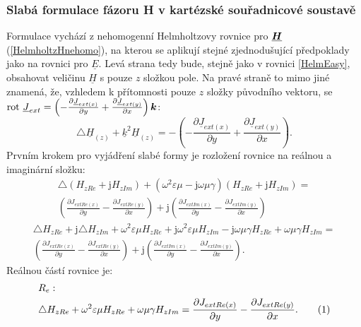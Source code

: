 \documentclass[12pt,a4paper,oneside]{article}
\numberwithin{equation}{section} %
\numberwithin{figure}{section} %
\numberwithin{table}{section} %
\newcommand{\mj}{\mathrm{j}} %
\renewcommand{\vec}[1]{\mbox{\boldmath$#1$}} %
\newcommand{\faz}[1]{{\underline{#1}}} %
\newcommand{\rot}{\mathrm{rot}\ }
\newcommand\numberthis{\addtocounter{equation}{1}\tag{\theequation}}
\begin{document}
\subsubsection{Slabá formulace fázoru H v kartézské souřadnicové soustavě}
Formulace vychází z nehomogenní Helmholtzovy rovnice pro $\faz{\vec{H}}$ (\ref{HelmholtzHnehomo}), na kterou se aplikují stejné zjednodušující předpoklady jako na rovnici pro $\faz{E}$. Levá strana tedy bude, stejně jako v rovnici \ref{HelmEasy}, obsahovat veličinu $\faz{H}$ s pouze $z$ složkou pole. Na pravé straně to mimo jiné znamená, že, vzhledem k přítomnosti pouze $z$ složky původního vektoru, se $\rot \faz{J} _{ext} = \left( - \frac{\partial \faz{J} _{ext(x)}}{\partial y} + \frac{\partial \faz{J} _{ext(y)}}{\partial x} \right) \vec{k}$:
\begin{equation}
\label{HelmEasyH}
\triangle \faz{H} _{(z)} + \faz{k} ^2 \faz{H} _{(z)} = - \left( - \frac{\partial \faz{J} _{ext(x)}}{\partial y} + \frac{\partial \faz{J} _{ext(y)}}{\partial x} \right) .
\end{equation}
Prvním krokem pro vyjádření slabé formy je rozložení rovnice na reálnou a imaginární složku:
\begin{equation}
\begin{split}
\triangle (H _{zRe} + \mj H _{zIm}) + (\omega ^2 \varepsilon \mu - \mj \omega \mu \gamma) (H _{zRe} + \mj H _{zIm}) =\\ 
\left( \frac{\partial J _{extRe(x)}}{\partial y} - \frac{\partial J _{extRe(y)}}{\partial x} \right) + \mj \left( \frac{\partial J _{extIm(x)}}{\partial y} - \frac{\partial J _{extIm(y)}}{\partial x} \right)
\end{split}
\end{equation}
\begin{equation}
\begin{split}
\triangle H _{zRe} + \mj \triangle H _{zIm} + \omega ^2 \varepsilon \mu H_ {zRe} + \mj \omega ^2 \varepsilon \mu H _{zIm} - \mj \omega \mu \gamma H _{zRe} + \omega \mu \gamma H _{zIm} =\\
\left( \frac{\partial J _{extRe(x)}}{\partial y} - \frac{\partial J _{extRe(y)}}{\partial x} \right) + \mj \left( \frac{\partial J _{extIm(x)}}{\partial y} - \frac{\partial J _{extIm(y)}}{\partial x} \right) .
\end{split}
\end{equation}
Reálnou částí rovnice je:
\begin{align*}
&R_{e}:
\\
&\triangle H_ {zRe} + \omega ^2 \varepsilon \mu H_ {zRe} + \omega \mu \gamma H _{zIm} = \frac{\partial J _{extRe(x)}}{\partial y} - \frac{\partial J _{extRe(y)}}{\partial x} .
\numberthis
\end{align*}
\end{document}
